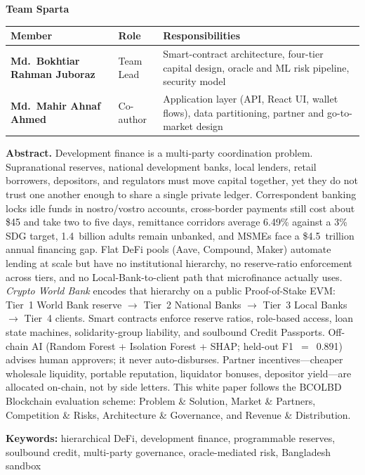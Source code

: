 \documentclass[11pt,a4paper]{article}
\newcommand{\tablehead}{\rowcolor{HeadShade}\bfseries}
\begin{document}
\vspace{2.2mm}
\noindent\textbf{Team Sparta}
\vspace{1mm}

\noindent
{\small
\begin{tabularx}{\textwidth}{@{}>{\bfseries}p{4.7cm}p{3.3cm}X@{}}
\toprule
\tablehead Member & Role & Responsibilities \\
\midrule
Md.\ Bokhtiar Rahman Juboraz & Team Lead & Smart-contract architecture, four-tier capital design, oracle and ML risk pipeline, security model \\
Md.\ Mahir Ahnaf Ahmed & Co-author & Application layer (API, React UI, wallet flows), data partitioning, partner and go-to-market design \\
\bottomrule
\end{tabularx}
}

\vspace{3.4mm}
\noindent
\colorbox{HeadShade}{%
\begin{minipage}{\dimexpr\textwidth-2\fboxsep\relax}
\vspace{1.6mm}
\textbf{Abstract.}
Development finance is a multi-party coordination problem. Supranational reserves, national development banks, local lenders, retail borrowers, depositors, and regulators must move capital together, yet they do not trust one another enough to share a single private ledger. Correspondent banking locks idle funds in nostro/vostro accounts, cross-border payments still cost about \$45 and take two to five days, remittance corridors average 6.49\% against a 3\% SDG target, 1.4~billion adults remain unbanked, and MSMEs face a \$4.5~trillion annual financing gap. Flat DeFi pools (Aave, Compound, Maker) automate lending at scale but have no institutional hierarchy, no reserve-ratio enforcement across tiers, and no Local-Bank-to-client path that microfinance actually uses. \textit{Crypto World Bank} encodes that hierarchy on a public Proof-of-Stake EVM: Tier~1 World Bank reserve $\to$ Tier~2 National Banks $\to$ Tier~3 Local Banks $\to$ Tier~4 clients. Smart contracts enforce reserve ratios, role-based access, loan state machines, solidarity-group liability, and soulbound Credit Passports. Off-chain AI (Random Forest + Isolation Forest + SHAP; held-out F1~$=$~0.891) advises human approvers; it never auto-disburses. Partner incentives---cheaper wholesale liquidity, portable reputation, liquidator bonuses, depositor yield---are allocated on-chain, not by side letters. This white paper follows the BCOLBD Blockchain evaluation scheme: Problem \& Solution, Market \& Partners, Competition \& Risks, Architecture \& Governance, and Revenue \& Distribution.
\vspace{1.2mm}

\noindent\textbf{Keywords:} hierarchical DeFi, development finance, programmable reserves, soulbound credit, multi-party governance, oracle-mediated risk, Bangladesh sandbox
\vspace{1.4mm}
\end{minipage}%
}
\end{document}
